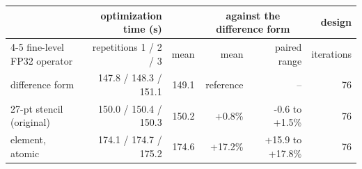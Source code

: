 \begin{tabular}{lrrrrr}
\toprule
 & optimization time (s) & & \multicolumn{2}{c}{against the difference form} & design \\
\cmidrule(lr){4-5}
fine-level FP32 operator & repetitions 1 / 2 / 3 & mean & mean & paired range & iterations \\
\midrule
difference form & 147.8 / 148.3 / 151.1 & 149.1 & reference & -- & 76 \\
27-pt stencil (original) & 150.0 / 150.4 / 150.3 & 150.2 & +0.8\% & -0.6 to +1.5\% & 76 \\
element, atomic & 174.1 / 174.7 / 175.2 & 174.6 & +17.2\% & +15.9 to +17.8\% & 76 \\
\bottomrule
\end{tabular}
